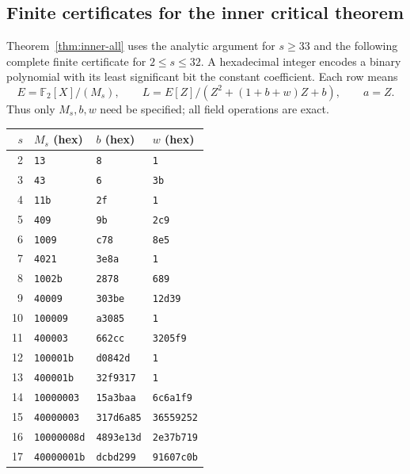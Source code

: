 \documentclass[11pt]{article}
\begin{document}
\subsection*{Finite certificates for the inner critical theorem}
\label{app:inner-cert}
Theorem~\ref{thm:inner-all} uses the analytic argument for $s\ge33$
and the following complete finite certificate for $2\le s\le32$.
A hexadecimal integer encodes a binary polynomial with its least
significant bit the constant coefficient. Each row means
\[
 E=\mathbb F_2[X]/(M_s),\qquad
 L=E[Z]/(Z^2+(1+b+w)Z+b),\qquad a=Z.
\]
Thus only $M_s,b,w$ need be specified; all field operations are exact.
\begin{center}\small
\begin{tabular}{r|lll}
$s$ & $M_s$ (hex) & $b$ (hex) & $w$ (hex)\\\hline
2 & \texttt{13} & \texttt{8} & \texttt{1}\\
3 & \texttt{43} & \texttt{6} & \texttt{3b}\\
4 & \texttt{11b} & \texttt{2f} & \texttt{1}\\
5 & \texttt{409} & \texttt{9b} & \texttt{2c9}\\
6 & \texttt{1009} & \texttt{c78} & \texttt{8e5}\\
7 & \texttt{4021} & \texttt{3e8a} & \texttt{1}\\
8 & \texttt{1002b} & \texttt{2878} & \texttt{689}\\
9 & \texttt{40009} & \texttt{303be} & \texttt{12d39}\\
10 & \texttt{100009} & \texttt{a3085} & \texttt{1}\\
11 & \texttt{400003} & \texttt{662cc} & \texttt{3205f9}\\
12 & \texttt{100001b} & \texttt{d0842d} & \texttt{1}\\
13 & \texttt{400001b} & \texttt{32f9317} & \texttt{1}\\
14 & \texttt{10000003} & \texttt{15a3baa} & \texttt{6c6a1f9}\\
15 & \texttt{40000003} & \texttt{317d6a85} & \texttt{36559252}\\
16 & \texttt{10000008d} & \texttt{4893e13d} & \texttt{2e37b719}\\
17 & \texttt{40000001b} & \texttt{dcbd299} & \texttt{91607c0b}\\
\end{tabular}
\end{center}
\end{document}

